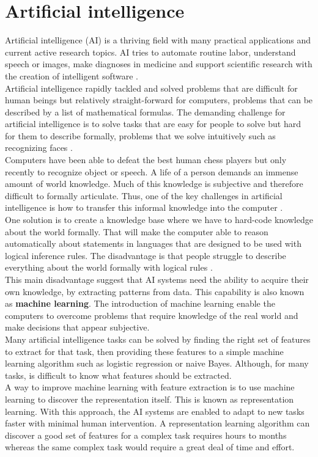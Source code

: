 \section{Artificial intelligence}
Artificial intelligence (\ac{AI}) is a thriving field with many practical applications and current active research topics. AI tries to automate routine labor, understand speech or images, make diagnoses in medicine and support scientific research with the creation of intelligent software \cite{Goodfellow-et-al-2016}.\\
Artificial intelligence rapidly tackled and solved problems that are difficult for human beings but relatively straight-forward for computers, problems that can be described by a list of mathematical formulas. The demanding challenge for artificial intelligence is to solve tasks that are easy for people to solve but hard for them to describe formally, problems that we solve intuitively such as recognizing faces \cite{Goodfellow-et-al-2016}.\\
Computers have been able to defeat the best human chess players but only recently to recognize object or speech. A life of a person demands an immense amount of world knowledge. Much of this knowledge is subjective and therefore difficult to formally articulate. Thus, one of the key challenges in artificial intelligence is how to transfer this informal knowledge into the computer \cite{Goodfellow-et-al-2016}.\\
One solution is to create a knowledge base where we have to hard-code knowledge about the world formally. That will make the computer able to reason automatically about statements in languages that are designed to be used with logical inference rules. The disadvantage is that people struggle to describe everything about the world formally with logical rules \cite{Goodfellow-et-al-2016}.\\
This main disadvantage suggest that AI systems need the ability to acquire their own knowledge, by extracting patterns from data. This capability is also known as \textbf{machine learning}. The introduction of machine learning enable the computers to overcome problems that require knowledge of the real world and make decisions that appear subjective\cite{Goodfellow-et-al-2016}.\\
Many artificial intelligence  tasks can be solved by finding the right set of features to extract for that task, then providing these features to a simple machine learning algorithm such as logistic regression or naive Bayes. Although, for many tasks, is difficult to know what features should be extracted. \\
A way to improve machine learning with feature extraction is to use machine learning to discover the representation itself. This is known as representation learning. With this approach, the AI systems are enabled to adapt to new tasks faster with minimal human intervention. A representation learning algorithm can discover a good set of features for a complex task requires hours to months whereas the same complex task would require a great deal of time and effort.
